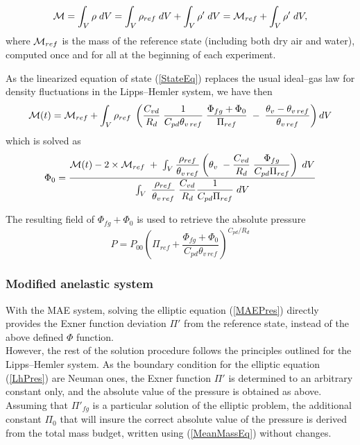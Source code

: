 \begin{equation}
{\cal M} = \int _{V} \rho \;  dV =  \int _{V} \rho_{ref} \;  dV +
\int _{V} \rho '  \; dV
 =   {\cal M}_{ref}  +
\int _{V} \rho ' \;  dV,
\label{MeanMassEq}
\end{equation}
where ${\cal M}_{ref}$ is the mass of the reference state (including both
dry air and water), computed once and for all at the beginning of each
experiment.

As the linearized equation of state (\ref{StateEq}) replaces the usual ideal--gas law for
density fluctuations in the Lipps--Hemler system, we have then
\begin{equation}
{\cal M}(t)  =    {\cal M}_{ref}  + \int _{V} \rho_{ref} \;  \left(
 \dfrac{C_{vd}}{R_d} \;  \dfrac{1}{C_{pd}\theta_{v\,ref}}
 \; \dfrac{\Phi_{fg} +\Phi_{0} }{ \Pi_{ref}} \;
- \;  \dfrac{\theta_v -\theta_{v\,ref}}{\theta_{v\,ref}}
\right) dV
\end{equation}
which is solved as
\begin{equation}
\Phi_{0}   =  \dfrac{{\cal M}(t) - 2 \times {\cal M}_{ref}
 \; +  \; \int _{V} \dfrac{\rho_{ref}}{\theta_{v\,ref}}
\left(\theta_v \;  -  \dfrac{C_{vd}}{R_d}
 \; \dfrac{\Phi_{fg}}{C_{pd}\Pi_{ref}}\right) \;  dV  }{ \int _{V} \;
 \dfrac{\rho_{ref}}{\theta_{v\,ref}}
 \;  \dfrac{C_{vd}}{R_d}\dfrac{1}{C_{pd}\Pi_{ref}}  \;  dV }
\end{equation}

The resulting field of $\Phi_{fg} + \Phi_0$ is used to retrieve the
absolute pressure
\begin{equation}
P= P_{00} \left(\Pi_{ref} + \dfrac{\Phi_{fg} + \Phi_0}{C_{pd}
\theta_{v\,ref} }\right)^{C_{pd}/R_d}
\end{equation}

\subsubsection{Modified anelastic system}

With the MAE system, solving the elliptic equation (\ref{MAEPres}) directly provides
the Exner function deviation $\Pi '$ from the reference state, instead of the above
defined  $\Phi$ function. \\

However, the rest of the solution procedure follows the principles outlined for
the Lipps--Hemler system. As the boundary condition for the elliptic equation (\ref{LhPres})
are Neuman ones, the Exner function $\Pi '$ is determined to an arbitrary constant only, and
the absolute value of the pressure is obtained as above. Assuming that $\Pi '_{fg}$ is
a particular solution of the elliptic problem, the additional constant $\Pi_0$ that
will insure the correct absolute value of the pressure is derived from the total mass budget,
written using (\ref{MeanMassEq}) without changes.\\

